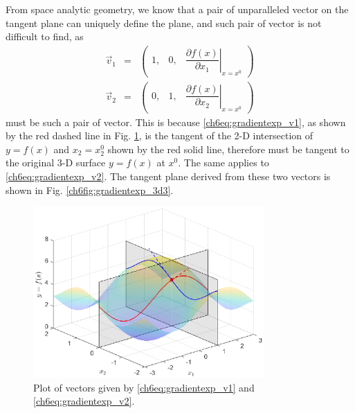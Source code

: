 From space analytic geometry, we know that a pair of unparalleled vector on the tangent plane can uniquely define the plane, and such pair of vector is not difficult to find, as
\begin{eqnarray}
 \vec{v}_1 &=& \left(\begin{array}{ccc}
                       1, & 0, & \left.\dfrac{\partial f(x)}{\partial x_1}\right|_{x=x^0}
                     \end{array}\right) \label{ch6eq:gradientexp_v1} \\
 \vec{v}_2 &=& \left(\begin{array}{ccc}
                       0, & 1, & \left.\dfrac{\partial f(x)}{\partial x_2}\right|_{x=x^0}
                     \end{array}\right) \label{ch6eq:gradientexp_v2}
\end{eqnarray}
must be such a pair of vector. This is because \eqref{ch6eq:gradientexp_v1}, as shown by the red dashed line in Fig. \ref{ch6fig:gradientexp_3d2}, is the tangent of the 2-D intersection of $y=f(x)$ and $x_2 = x_2^0$ shown by the red solid line, therefore must be tangent to the original 3-D surface $y=f(x)$ at $x^0$. The same applies to \eqref{ch6eq:gradientexp_v2}. The tangent plane derived from these two vectors is shown in Fig. \ref{ch6fig:gradientexp_3d3}.

\begin{figure}
	\centering
	\includegraphics[width=250pt]{chapters/part-2/figures/gradientexp_3d2.eps}
	\caption{Plot of vectors given by \eqref{ch6eq:gradientexp_v1} and \eqref{ch6eq:gradientexp_v2}.} \label{ch6fig:gradientexp_3d2}
\end{figure}

